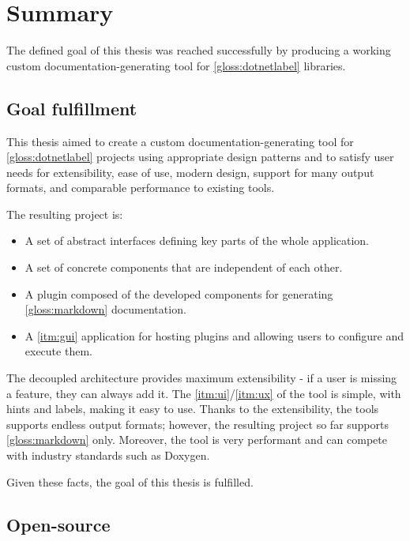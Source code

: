 \chapter*{Summary}

The defined goal of this thesis was reached successfully by producing a working custom documentation-generating tool for \ref{gloss:dotnetlabel} libraries.

\section*{Goal fulfillment}

This thesis aimed to create a custom documentation-generating tool for \ref{gloss:dotnetlabel} projects using appropriate design patterns and to satisfy user needs for extensibility, ease of use, modern design, support for many output formats, and comparable performance to existing tools.

The resulting project is:
\begin{itemize}
    \item A set of abstract interfaces defining key parts of the whole application.
    \item A set of concrete components that are independent of each other.
    \item A plugin composed of the developed components for generating \ref{gloss:markdown} documentation.
    \item A \ref{itm:gui} application for hosting plugins and allowing users to configure and execute them.
\end{itemize}

The decoupled architecture provides maximum extensibility - if a user is missing a feature, they can always add it. The \ref{itm:ui}/\ref{itm:ux} of the tool is simple, with hints and labels, making it easy to use. Thanks to the extensibility, the tools supports endless output formats; however, the resulting project so far supports \ref{gloss:markdown} only. Moreover, the tool is very performant and can compete with industry standards such as Doxygen.

Given these facts, the goal of this thesis is fulfilled.

\section*{Open-source} \label{sec:openSource}

